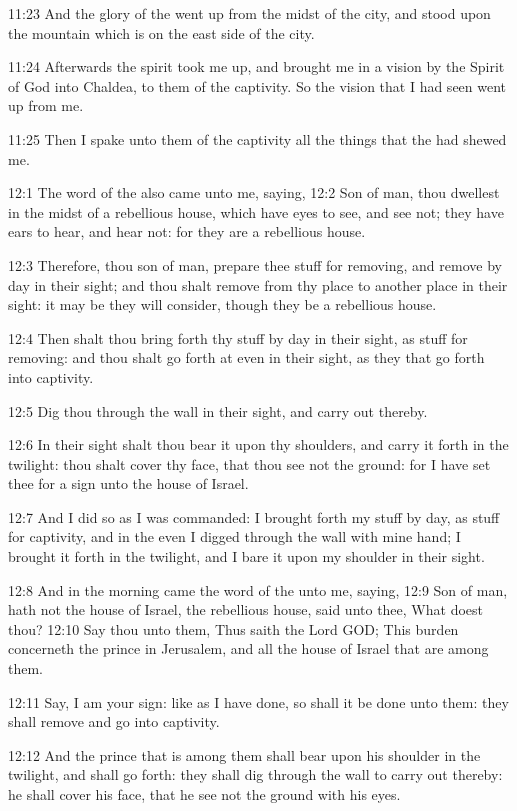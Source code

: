 11:23 And the glory of the \LORD went up from the midst of the city,
and stood upon the mountain which is on the east side of the city.

11:24 Afterwards the spirit took me up, and brought me in a vision by
the Spirit of God into Chaldea, to them of the captivity. So the
vision that I had seen went up from me.

11:25 Then I spake unto them of the captivity all the things that the
\LORD had shewed me.

12:1 The word of the \LORD also came unto me, saying, 12:2 Son of man,
thou dwellest in the midst of a rebellious house, which have eyes to
see, and see not; they have ears to hear, and hear not: for they are a
rebellious house.

12:3 Therefore, thou son of man, prepare thee stuff for removing, and
remove by day in their sight; and thou shalt remove from thy place to
another place in their sight: it may be they will consider, though
they be a rebellious house.

12:4 Then shalt thou bring forth thy stuff by day in their sight, as
stuff for removing: and thou shalt go forth at even in their sight, as
they that go forth into captivity.

12:5 Dig thou through the wall in their sight, and carry out thereby.

12:6 In their sight shalt thou bear it upon thy shoulders, and carry
it forth in the twilight: thou shalt cover thy face, that thou see not
the ground: for I have set thee for a sign unto the house of Israel.

12:7 And I did so as I was commanded: I brought forth my stuff by day,
as stuff for captivity, and in the even I digged through the wall with
mine hand; I brought it forth in the twilight, and I bare it upon my
shoulder in their sight.

12:8 And in the morning came the word of the \LORD unto me, saying,
12:9 Son of man, hath not the house of Israel, the rebellious house,
said unto thee, What doest thou?  12:10 Say thou unto them, Thus saith
the Lord GOD; This burden concerneth the prince in Jerusalem, and all
the house of Israel that are among them.

12:11 Say, I am your sign: like as I have done, so shall it be done
unto them: they shall remove and go into captivity.

12:12 And the prince that is among them shall bear upon his shoulder
in the twilight, and shall go forth: they shall dig through the wall
to carry out thereby: he shall cover his face, that he see not the
ground with his eyes.

